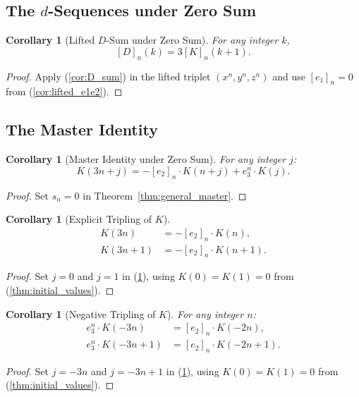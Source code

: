 \documentclass[12pt]{article}
\newtheorem{corollary}[theorem]{Corollary}
\theoremstyle{definition}
\newcommand{\lift}[2]{[#1]_{#2}}
\begin{document}
	\subsection{The $d$-Sequences under Zero Sum}
	
	\begin{corollary}[Lifted $D$-Sum under Zero Sum]
		\label{cor:D_sum_zero}
		For any integer $k$,
		\[ \lift{D}{n}(k) = 3\lift{K}{n}(k+1). \]
	\end{corollary}
	\begin{proof}
		Apply (\ref{cor:D_sum}) in the lifted triplet $(x^n, y^n, z^n)$ and use $\lift{e_1}{n} = 0$ from (\ref{cor:lifted_e1e2}).
	\end{proof}
	
	\subsection{The Master Identity}
	
	\begin{corollary}[Master Identity under Zero Sum]
		\label{cor:master_zero_sum}
		For any integer $j$:
		\[ K(3n+j) = -\lift{e_2}{n}\cdot K(n+j) + e_3^n\cdot K(j). \]
	\end{corollary}
	\begin{proof}
		Set $s_n = 0$ in Theorem~\ref{thm:general_master}.
	\end{proof}
	
	\begin{corollary}[Explicit Tripling of $K$]
		\label{cor:K_tripling}
		\begin{align*}
			K(3n) &= -\lift{e_2}{n}\cdot K(n), \\
			K(3n+1) &= -\lift{e_2}{n}\cdot K(n+1).
		\end{align*}
	\end{corollary}
	\begin{proof}
		Set $j = 0$ and $j = 1$ in (\ref{cor:master_zero_sum}), using $K(0) = K(1) = 0$ from (\ref{thm:initial_values}).
	\end{proof}
	
	\begin{corollary}[Negative Tripling of $K$]
		\label{cor:K_neg_tripling}
		For any integer $n$:
		\begin{align*}
			e_3^n \cdot K(-3n)   &= \lift{e_2}{n} \cdot K(-2n), \\
			e_3^n \cdot K(-3n+1) &= \lift{e_2}{n} \cdot K(-2n+1).
		\end{align*}
	\end{corollary}
	\begin{proof}
		Set $j = -3n$ and $j = -3n+1$ in (\ref{cor:master_zero_sum}), using $K(0) = K(1) = 0$ from (\ref{thm:initial_values}).
	\end{proof}
	
\end{document}
